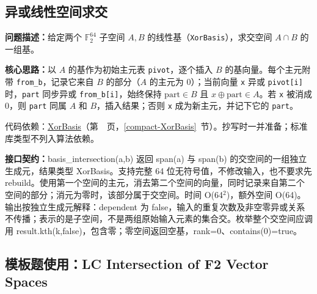 \Needspace{136pt}



\newpage



\Needspace{510pt}

\subsection{异或线性空间求交}\label{compact-basis_intersection}

\noindent\textbf{问题描述：}\allowbreak 给定两个 $\mathbb{F}_2^{64}$ 子空间 $A,B$ 的线性基（\texttt{XorBasis}），求交空间 $A\cap B$ 的一组基。

\textbf{核心思路：}\allowbreak 以 $A$ 的基作为初始主元表 \texttt{pivot}，逐个插入 $B$ 的基向量。每个主元附带 \texttt{from\_b}，记录它来自 $B$ 的部分（$A$ 的主元为 0）；当前向量 \texttt{x} 异或 \texttt{pivot[i]} 时，\texttt{part} 同步异或 \texttt{from\_b[i]}，始终保持 $\mathrm{part}\in B$ 且 $x\oplus\mathrm{part}\in A$。若 \texttt{x} 被消成 0，则 \texttt{part} 同属 $A$ 和 $B$，插入结果；否则 \texttt{x} 成为新主元，并记下它的 \texttt{part}。

代码依赖：\hyperref[compact-XorBasis]{XorBasis}（第~\pageref{compact-XorBasis}~页，\ref{compact-XorBasis}~节）。抄写时一并准备；标准库类型不列入算法依赖。

{\sloppy{}\noindent\textbf{接口契约：}basis\_intersection(a,b) 返回 span(a) 与 span(b) 的交空间的一组独立生成元，结果类型 XorBasis。支持完整 64 位无符号值，不修改输入，也不要求先 rebuild。使用第一个空间的主元，消去第二个空间的向量，同时记录来自第二个空间的部分；消元为零时，该部分属于交空间。时间 O(64$^{2}$)，额外空间 O(64)。输出按独立生成元解释：dependent 为 false，输入的重复次数及非空零异或关系不传播；表示的是子空间，不是两组原始输入元素的集合交。枚举整个交空间应调用 result.kth(k,false)，包含零；零空间返回空基，rank=0、contains(0)=true。\par}



\Needspace{526pt}

\subsection*{模板题使用：LC Intersection of F2 Vector Spaces}

